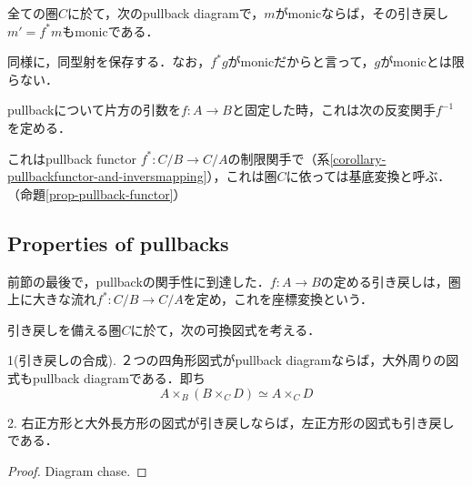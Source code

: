 \documentclass[uplatex, dvipdfmx]{jsarticle}
\begin{document}
\begin{proposition*}[引き戻しはmonomorphismを保存する]
    全ての圏$C$に於て，次のpullback diagramで，$m$がmonicならば，その引き戻し$m'=f^*m$もmonicである．
    \begin{center}
    \end{center}
\end{proposition*}
\begin{remark*}
    同様に，同型射を保存する．なお，$f^*g$がmonicだからと言って，$g$がmonicとは限らない．
\end{remark*}
\begin{proposition*}
    pullbackについて片方の引数を$f:A\to B$と固定した時，これは次の反変関手$f^{-1}$を定める．
    \begin{center}
    \end{center}
\end{proposition*}
\begin{remark*}
    これはpullback functor $f^*:C/B\to C/A$の制限関手で（系\ref{corollary-pullbackfunctor-and-inversmapping}），これは圏$C$に依っては基底変換と呼ぶ．（命題\ref{prop-pullback-functor}）
\end{remark*}

\subsection{Properties of pullbacks}
前節の最後で，pullbackの関手性に到達した．$f:A\to B$の定める引き戻しは，圏上に大きな流れ$f^*:C/B\to C/A$を定め，これを座標変換という．

\begin{lemma}\label{lemma-two-pullbacks}
    引き戻しを備える圏$C$に於て，次の可換図式を考える．
    \begin{center}
    \end{center}

    1(引き戻しの合成). ２つの四角形図式がpullback diagramならば，大外周りの図式もpullback diagramである．即ち
    \[ A\times_B(B\times_CD)\simeq A\times_CD \]

    2. 右正方形と大外長方形の図式が引き戻しならば，左正方形の図式も引き戻しである．
\end{lemma}
\begin{proof}
    Diagram chase.
\end{proof}
\end{document}
